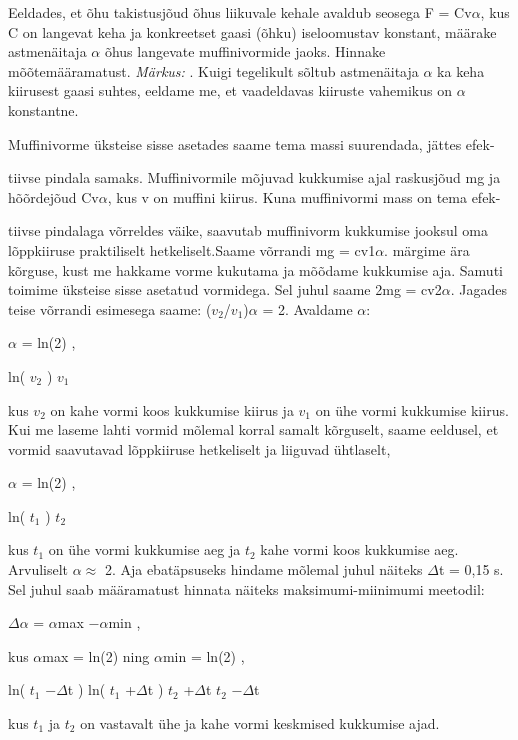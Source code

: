 
Eeldades, et õhu takistusjõud õhus liikuvale kehale avaldub seosega F = Cv$\alpha$, kus C on langevat keha ja konkreetset gaasi (õhku) iseloomustav konstant, määrake astmenäitaja $\alpha$ õhus langevate muffinivormide jaoks. Hinnake mõõtemääramatust.
\textit{Märkus:} . Kuigi tegelikult sõltub astmenäitaja $\alpha$ ka keha kiirusest gaasi suhtes, eeldame me, et vaadeldavas kiiruste vahemikus on $\alpha$ konstantne.

\hint

\solu
Muffinivorme üksteise sisse asetades saame tema massi suurendada, jättes efek-

tiivse pindala samaks. Muffinivormile mõjuvad kukkumise ajal raskusjõud mg ja hõõrdejõud Cv$\alpha$, kus v on muffini kiirus. Kuna muffinivormi mass on tema efek-

tiivse pindalaga võrreldes väike, saavutab muffinivorm kukkumise jooksul oma lõppkiiruse praktiliselt hetkeliselt.Saame võrrandi mg = cv1$\alpha$. märgime ära kõrguse, kust me hakkame vorme kukutama ja mõõdame kukkumise aja. Samuti toimime üksteise sisse asetatud vormidega. Sel juhul saame 2mg = cv2$\alpha$. Jagades teise võrrandi esimesega saame: ($v_2$/$v_1$)$\alpha$ = 2. Avaldame $\alpha$:

$\alpha$ = ln(2) ,

ln( $v_2$ ) $v_1$

kus $v_2$ on kahe vormi koos kukkumise kiirus ja $v_1$ on ühe vormi kukkumise kiirus. Kui me laseme lahti vormid mõlemal korral samalt kõrguselt, saame eeldusel, et vormid saavutavad lõppkiiruse hetkeliselt ja liiguvad ühtlaselt,

$\alpha$ = ln(2) ,

ln( $t_1$ ) $t_2$

kus $t_1$ on ühe vormi kukkumise aeg ja $t_2$ kahe vormi koos kukkumise aeg. Arvuliselt $\alpha \approx$ 2. Aja ebatäpsuseks hindame mõlemal juhul näiteks $\Delta$t = 0,15 s. Sel juhul saab määramatust hinnata näiteks maksimumi-miinimumi meetodil:

$\Delta\alpha$ = $\alpha$max $- \alpha$min ,

kus $\alpha$max = ln(2) ning $\alpha$min = ln(2) ,

ln( $t_1$ $-\Delta$t ) ln( $t_1$ +$\Delta$t ) $t_2$ +$\Delta$t $t_2$ $-\Delta$t

kus $t_1$ ja $t_2$ on vastavalt ühe ja kahe vormi keskmised kukkumise ajad.
\probend
